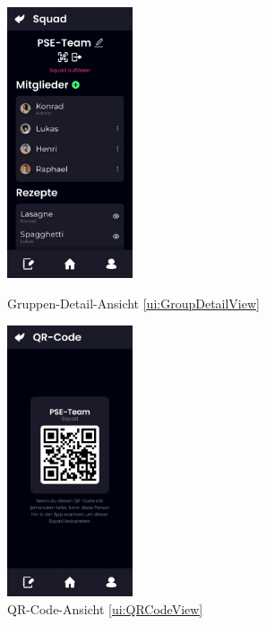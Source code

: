\documentclass[parskip=full]{scrartcl}
\begin{document}
\begin{figure}[htp]
    \begin{minipage}
        [t]{0.49\textwidth}
        \centering
        \includegraphics[height=80mm]{images/ui/GroupDetailView.jpg}
        \caption{Gruppen-Detail-Ansicht \ref{ui:GroupDetailView}}
        \label{fig:GroupDetailView}
    \end{minipage}
    \begin{minipage}
        [t]{0.49\textwidth}
        \centering
        \includegraphics[height=80mm]{images/ui/QRCodeView.jpg}
        \caption{QR-Code-Ansicht \ref{ui:QRCodeView}}
        \label{fig:QRCodeView}
    \end{minipage}
\end{figure}
\newpage
\renewcommand{\theparagraph}{\arabic{section}.\arabic{subsection}.\arabic{subsubsection}.\arabic{paragraph}}
\setcounter{secnumdepth}{3}
\end{document}
